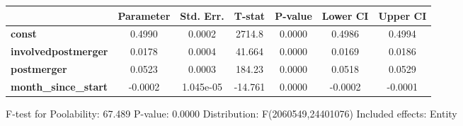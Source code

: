\documentclass{report}
\begin{document}
\begin{center}
\begin{tabular}{lcccccc}
                             & \textbf{Parameter} & \textbf{Std. Err.} & \textbf{T-stat} & \textbf{P-value} & \textbf{Lower CI} & \textbf{Upper CI}  \\
\midrule
\textbf{const}               &       0.4990       &       0.0002       &      2714.8     &      0.0000      &       0.4986      &       0.4994       \\
\textbf{involvedpostmerger}  &       0.0178       &       0.0004       &      41.664     &      0.0000      &       0.0169      &       0.0186       \\
\textbf{postmerger}          &       0.0523       &       0.0003       &      184.23     &      0.0000      &       0.0518      &       0.0529       \\
\textbf{month\_since\_start} &      -0.0002       &     1.045e-05      &     -14.761     &      0.0000      &      -0.0002      &      -0.0001       \\
\bottomrule
\end{tabular}
\end{center}

F-test for Poolability: 67.489 \newline
 P-value: 0.0000 \newline
 Distribution: F(2060549,24401076) \newline
  \newline
 Included effects: Entity
\end{document}

